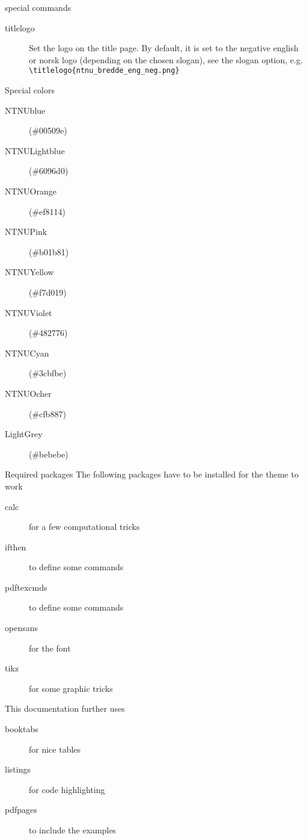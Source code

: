 \documentclass[aspectratio=169]{beamer}
\begin{document}
		\begin{frame}[fragile]{special commands}
			\begin{description}
				\item[titlelogo]
				Set the logo on the title page. By default, it is set to the negative english or norsk logo (depending on the chosen slogan), see the slogan option, e.g.\,
				\lstinline!\titlelogo{ntnu_bredde_eng_neg.png}!
			\end{description}
		\end{frame}
		\begin{frame}{Special colors}
			\begin{description}
				\item[{\color{NTNUBlue} NTNUblue}] (\#{\color{NTNUBlue}00509e})
				\item[{\color{NTNULightblue} NTNULightblue}] (\#{\color{NTNULightblue}6096d0})
				\item[{\color{NTNUOrange} NTNUOrange}] (\#{\color{NTNUOrange}ef8114})
				\item[{\color{NTNUPink} NTNUPink}] (\#{\color{NTNUPink}b01b81})
				\item[{\color{NTNUYellow} NTNUYellow}] (\#{\color{NTNUYellow}f7d019})
				\item[{\color{NTNUViolet} NTNUViolet}] (\#{\color{NTNUViolet}482776})
				\item[{\color{NTNUCyan} NTNUCyan}] (\#{\color{NTNUCyan}3cbfbe})
				\item[{\color{NTNUOcher} NTNUOcher}] (\#{\color{NTNUOcher}cfb887})
				\item[{\color{LightGrey} LightGrey}] (\#{\color{LightGrey}bebebe})
			\end{description}
		\end{frame}
		\begin{frame}{Required packages}
			The following packages have to be installed for the theme to work
			\begin{description}
				\item[calc] for a few computational tricks
				\item[ifthen] to define some commands
				\item[pdftexcmds] to define some commands
				\item[opensans] for the font
				\item[tikz] for some graphic tricks
			\end{description}
			This documentation further uses
			\begin{description}
				\item[booktabs] for nice tables
				\item[listings] for code highlighting
				\item[pdfpages] to include the examples
			\end{description}
		\end{frame}
\end{document}
